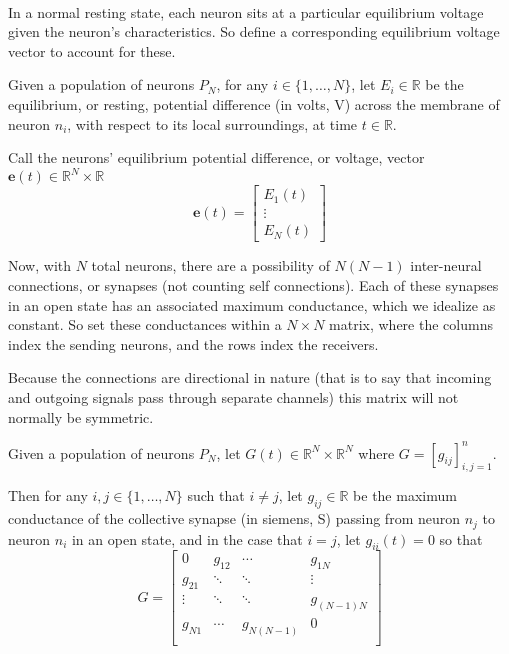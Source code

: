 \documentclass{article}
\begin{document}
\paragraph{}
In a normal resting state, each neuron sits at a particular equilibrium voltage given the neuron's characteristics. So define a corresponding equilibrium voltage vector to account for these.

\begin{definition}[$\mathbf{e}(t) = \textbf{neuron equilibrium potential vector}$]\label{e}
Given a population of neurons $P_{N}$, for any $i \in \{ 1, \dots, N \}$, let $E_{i}\in\mathbb{R}$ be the equilibrium, or resting, potential difference (in volts, V) across the membrane of neuron $n_{i}$, with respect to its local surroundings, at time $t\in\mathbb{R}$.

Call the neurons' equilibrium potential difference, or voltage, vector $\mathbf{e}(t)\in\mathbb{R}^{N}\times\mathbb{R}$ 
\[ \mathbf{e}(t) =
\begin{bmatrix}
E_{1}(t) \\
\vdots \\
E_{N}(t)
\end{bmatrix} \]
\end{definition}

Now, with $N$ total neurons, there are a possibility of $N(N-1)$ inter-neural connections, or synapses (not counting self connections). Each of these synapses in an open state has an associated maximum conductance, which we idealize as constant. So set these conductances within a $N\times N$ matrix, where the columns index the sending neurons, and the rows index the receivers.

Because the connections are directional in nature (that is to say that incoming and outgoing signals pass through separate channels) this matrix will not normally be symmetric.

\begin{definition}[$G = \textbf{synapse maximum conductance matrix}$]\label{G}
Given a population of neurons $P_{N}$, let $G(t) \in \mathbb{R}^{N} \times \mathbb{R}^{N}$ where $G = [g_{ij}]_{i,j=1}^{n}$.

Then for any $i,j \in \{ 1, \dots, N \}$ such that $i \ne j$, let $g_{ij}\in \mathbb{R}$ be the maximum conductance of the collective synapse (in siemens, S) passing from neuron $n_{j}$ to neuron $n_{i}$ in an open state, and in the case that $i=j$, let $g_{ii}(t) = 0$ so that
\[ G =
\begin{bmatrix}
0	&	g_{12}	& \cdots & g_{1N} \\
g_{21}	& \ddots & \ddots & \vdots \\
\vdots	& \ddots & \ddots & g_{(N-1)N} \\
g_{N1}	& \cdots & g_{N(N-1)} & 0 \\
\end{bmatrix}\]
\end{definition}
\end{document}
